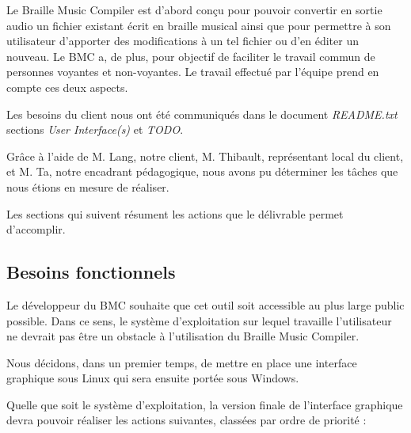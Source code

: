 
Le Braille Music Compiler est d'abord conçu pour pouvoir convertir en sortie audio un fichier existant écrit en braille musical ainsi que pour permettre à son utilisateur d'apporter des modifications à un tel fichier ou d'en éditer un nouveau. Le BMC a, de plus, pour objectif de faciliter le travail commun de personnes voyantes et non-voyantes.
Le travail effectué par l'équipe prend en compte ces deux aspects.

Les besoins du client nous ont été communiqués dans le document \textit{README.txt} sections \textit{User Interface(s)} et \textit{TODO}.

Grâce à l'aide de M. Lang, notre client, M. Thibault, représentant local du client, et M. Ta, notre encadrant pédagogique, nous avons pu déterminer les tâches que nous étions en mesure de réaliser. 

Les sections qui suivent résument les actions que le délivrable permet d'accomplir.


\subsection{Besoins fonctionnels}
Le développeur du BMC souhaite que cet outil soit accessible au plus large public possible. Dans ce sens, le système d'exploitation sur lequel travaille l'utilisateur ne devrait pas être un obstacle à l'utilisation du Braille Music Compiler.

Nous décidons, dans un premier temps, de mettre en place une interface graphique sous Linux qui sera ensuite portée sous Windows.
 
Quelle que soit le système d'exploitation, la version finale de l'interface graphique devra pouvoir réaliser les actions suivantes, classées par ordre de priorité : \\


